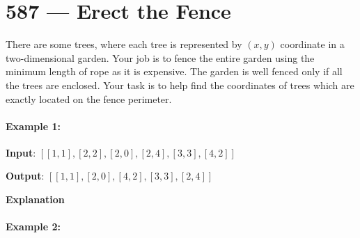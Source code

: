 \section{587 --- Erect the Fence}
There are some trees, where each tree is represented by $(x,y)$ coordinate in a two-dimensional garden. Your job is to fence the entire garden using the minimum length of rope as it is expensive. The garden is well fenced only if all the trees are enclosed. Your task is to help find the coordinates of trees which are exactly located on the fence perimeter.

\paragraph{Example 1:}

\begin{flushleft}
\textbf{Input}: $[[1,1],[2,2],[2,0],[2,4],[3,3],[4,2]]$

\textbf{Output}: $[[1,1],[2,0],[4,2],[3,3],[2,4]]$

\textbf{Explanation}
\begin{figure}[H]
\end{figure}
\end{flushleft}

\paragraph{Example 2:}

